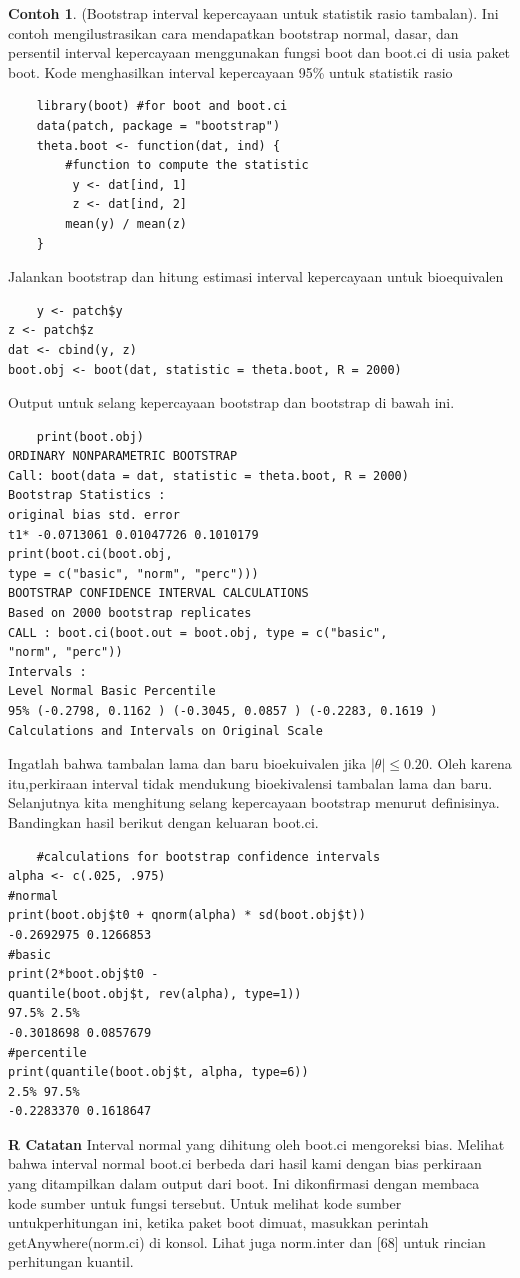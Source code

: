 \documentclass[a4paper,12pt]{article}
\theoremstyle{definition}
\newtheorem{example}{Contoh}[section]
\begin{document}
\begin{example} (Bootstrap interval kepercayaan untuk statistik rasio tambalan).
Ini contoh mengilustrasikan cara mendapatkan bootstrap normal, dasar, dan persentil interval kepercayaan menggunakan fungsi boot dan boot.ci di usia paket boot. Kode menghasilkan interval kepercayaan 95\% untuk statistik rasio
\begin{lstlisting}
    library(boot) #for boot and boot.ci
    data(patch, package = "bootstrap")
    theta.boot <- function(dat, ind) {
        #function to compute the statistic
         y <- dat[ind, 1]
         z <- dat[ind, 2]
        mean(y) / mean(z)
    }
\end{lstlisting}   
Jalankan bootstrap dan hitung estimasi interval kepercayaan untuk bioequivalen
\begin{lstlisting}
    y <- patch$y
z <- patch$z
dat <- cbind(y, z)
boot.obj <- boot(dat, statistic = theta.boot, R = 2000)
\end{lstlisting}
Output untuk selang kepercayaan bootstrap dan bootstrap di bawah ini.
\begin{lstlisting}
    print(boot.obj)
ORDINARY NONPARAMETRIC BOOTSTRAP
Call: boot(data = dat, statistic = theta.boot, R = 2000)
Bootstrap Statistics :
original bias std. error
t1* -0.0713061 0.01047726 0.1010179
print(boot.ci(boot.obj,
type = c("basic", "norm", "perc")))
BOOTSTRAP CONFIDENCE INTERVAL CALCULATIONS
Based on 2000 bootstrap replicates
CALL : boot.ci(boot.out = boot.obj, type = c("basic",
"norm", "perc"))
Intervals :
Level Normal Basic Percentile
95% (-0.2798, 0.1162 ) (-0.3045, 0.0857 ) (-0.2283, 0.1619 )
Calculations and Intervals on Original Scale
\end{lstlisting}
Ingatlah bahwa tambalan lama dan baru bioekuivalen jika $\left | \theta  \right |\leq 0.20$. Oleh karena itu,perkiraan interval tidak mendukung bioekivalensi tambalan lama dan baru.
Selanjutnya kita menghitung selang kepercayaan bootstrap menurut definisinya. Bandingkan hasil berikut dengan keluaran boot.ci.
\begin{lstlisting}
    #calculations for bootstrap confidence intervals
alpha <- c(.025, .975)
#normal
print(boot.obj$t0 + qnorm(alpha) * sd(boot.obj$t))
-0.2692975 0.1266853
#basic
print(2*boot.obj$t0 -
quantile(boot.obj$t, rev(alpha), type=1))
97.5% 2.5%
-0.3018698 0.0857679
#percentile
print(quantile(boot.obj$t, alpha, type=6))
2.5% 97.5%
-0.2283370 0.1618647
\end{lstlisting}
\textbf{R Catatan}
Interval normal yang dihitung oleh boot.ci mengoreksi bias. Melihat bahwa interval normal boot.ci berbeda dari hasil kami dengan bias perkiraan yang ditampilkan dalam output dari boot. Ini dikonfirmasi dengan membaca kode sumber untuk fungsi tersebut. Untuk melihat kode sumber untukperhitungan ini, ketika paket boot dimuat, masukkan perintah getAnywhere(norm.ci) di konsol. Lihat juga norm.inter dan [68] untuk rincian perhitungan kuantil.

\end{example}
\end{document}
